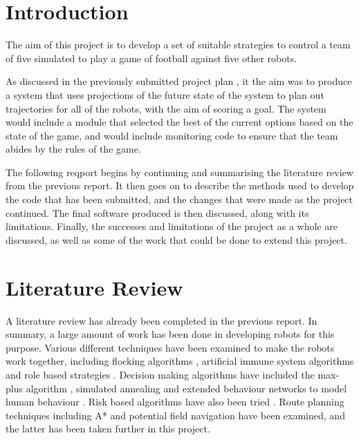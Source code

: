 \documentclass[10pt]{article}
\begin{document}


\section{Introduction}

The aim of this project is to develop a set of suitable strategies to control a
team of five simulated to play a game of football against five other robots.

As discussed in the previously submitted project plan \cite{pplr}, it the aim
was to produce a system that uses projections of the future state of the system
to plan out trajectories for all of the robots, with the aim of scoring a goal.
The system would include a module that selected the best of the current options
based on the state of the game, and would include monitoring code to ensure that
the team abides by the rules of the game.

The following reqport begins by continuing and summarising the literature review
from the previous report.  It then goes on to describe the methods used to
develop the code that has been submitted, and the changes that were made as the
project continued. The final software produced is then discussed, along with its
limitations. Finally, the successes and limitations of the project as a whole
are discussed, as well as some of the work that could be done to extend this
project.


\section{Literature Review}

A literature review has already been completed in the previous report.  In
summary, a large amount of work has been done in developing robots for this
purpose.  Various different techniques have been examined to make the robots
work together, including flocking algorithms \cite{taskBasedFlocking},
artificial immune system algorithms \cite{artificialImmuneSystemCooperation} and
role based strategies \cite{taskRoleSelectionStrategy}
\cite{multiagentsDynamicBoxChange}. Decision making algorithms have included the
max-plus algorithm \cite{maxPlusAlgorithm}, simulated annealing
\cite{simulatedAnnealingDecisionMaking} and extended behaviour networks to model
human behaviour \cite{modellingHumanDecisionMaking}. Risk based algorithms have
also been tried \cite{balancingGainsRisksCostsPassing}. Route planning
techniques including A* \cite{aiModernApproach} and potential field navigation
\cite{intelligentAlgorithmPathPlanning} have been examined, and the latter has
been taken further in this project.
\end{document}
